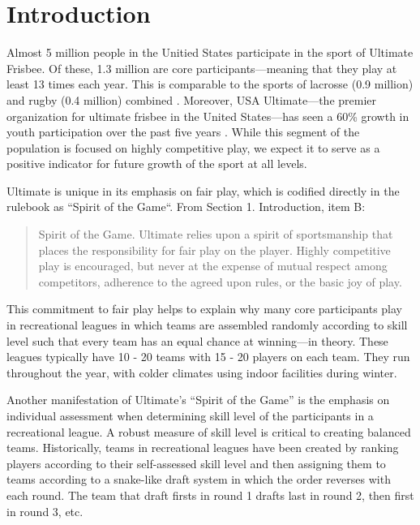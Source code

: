 \href{http://}{}\section{Introduction}\label{sec:introduction}

Almost 5 million people in the Unitied States participate in the sport of Ultimate Frisbee.  Of these, 1.3 million are core participants---meaning that they play at least 13 times each year.  This is comparable to the sports of lacrosse (0.9 million) and rugby (0.4 million) combined \cite{sfia_2016}. Moreover, USA Ultimate---the premier organization for ultimate frisbee in the United States---has seen a 60\% growth in youth participation over the past five years \cite{usau_2016}.  While this segment of the population is focused on highly competitive play, we expect it to serve as a positive indicator for future growth of the sport at all levels.

Ultimate is unique in its emphasis on fair play, which is codified directly in the rulebook as ``Spirit of the Game``.  From Section 1. Introduction, item B:

\begin{quote} Spirit of the Game. Ultimate relies upon a spirit of sportsmanship that places the responsibility for fair play on the player. Highly competitive play is encouraged, but never at the expense of mutual respect among competitors, adherence to the agreed upon rules, or the basic joy of play.
\end{quote}

This commitment to fair play helps to explain why many core participants play in recreational leagues in which teams are assembled randomly according to skill level such that every team has an equal chance at winning---in theory.  These leagues typically have 10 - 20 teams with 15 - 20 players on each team.  They run throughout the year, with colder climates using indoor facilities during winter.

Another manifestation of Ultimate's ``Spirit of the Game'' is the emphasis on individual assessment when determining skill level of the participants in a recreational league.  A robust measure of skill level is critical to creating balanced teams.  Historically, teams in recreational leagues have been created by ranking players according to their self-assessed skill level and then assigning them to teams according to a snake-like draft system in which the order reverses with each round.  The team that draft firsts in round 1 drafts last in round 2, then first in round 3, etc.

